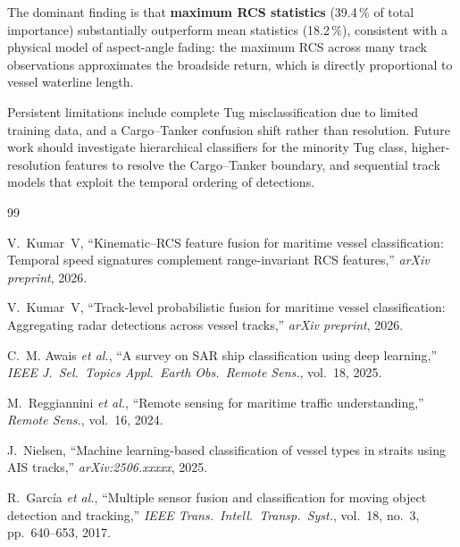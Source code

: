 \documentclass[10pt,journal,compsoc]{IEEEtran}
\begin{document}
The dominant finding is that \textbf{maximum RCS statistics} (39.4\,\% of total
importance) substantially outperform mean statistics (18.2\,\%), consistent
with a physical model of aspect-angle fading: the maximum RCS across many
track observations approximates the broadside return, which is directly
proportional to vessel waterline length.

Persistent limitations include complete Tug misclassification due to limited
training data, and a Cargo--Tanker confusion shift rather than resolution.
Future work should investigate hierarchical classifiers for the minority
Tug class, higher-resolution features to resolve the Cargo--Tanker boundary,
and sequential track models that exploit the temporal ordering of detections.


\begin{thebibliography}{99}

V.~Kumar~V, ``Kinematic--RCS feature fusion for maritime vessel classification:
Temporal speed signatures complement range-invariant RCS features,''
\emph{arXiv preprint}, 2026.

V.~Kumar~V, ``Track-level probabilistic fusion for maritime vessel classification:
Aggregating radar detections across vessel tracks,'' \emph{arXiv preprint}, 2026.

C.~M. Awais \emph{et al.}, ``A survey on SAR ship classification using deep
learning,'' \emph{IEEE J.\ Sel.\ Topics Appl.\ Earth Obs.\ Remote Sens.},
vol.~18, 2025.

M.~Reggiannini \emph{et al.}, ``Remote sensing for maritime traffic
understanding,'' \emph{Remote Sens.}, vol.~16, 2024.

J.~Nielsen, ``Machine learning-based classification of vessel types in straits
using AIS tracks,'' \emph{arXiv:2506.xxxxx}, 2025.

R.~Garc\'ia \emph{et al.}, ``Multiple sensor fusion and classification for
moving object detection and tracking,'' \emph{IEEE Trans.\ Intell.\ Transp.\
Syst.}, vol.~18, no.~3, pp.~640--653, 2017.

\end{thebibliography}
\end{document}
